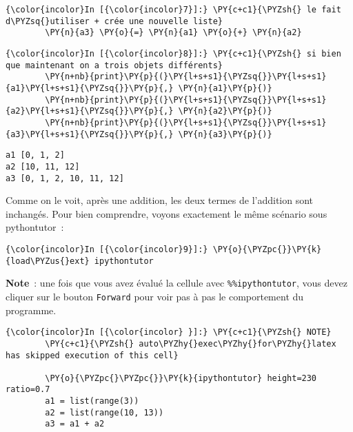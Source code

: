     \begin{Verbatim}[commandchars=\\\{\}]
{\color{incolor}In [{\color{incolor}7}]:} \PY{c+c1}{\PYZsh{} le fait d\PYZsq{}utiliser + crée une nouvelle liste}
        \PY{n}{a3} \PY{o}{=} \PY{n}{a1} \PY{o}{+} \PY{n}{a2}
\end{Verbatim}


    \begin{Verbatim}[commandchars=\\\{\}]
{\color{incolor}In [{\color{incolor}8}]:} \PY{c+c1}{\PYZsh{} si bien que maintenant on a trois objets différents}
        \PY{n+nb}{print}\PY{p}{(}\PY{l+s+s1}{\PYZsq{}}\PY{l+s+s1}{a1}\PY{l+s+s1}{\PYZsq{}}\PY{p}{,} \PY{n}{a1}\PY{p}{)}
        \PY{n+nb}{print}\PY{p}{(}\PY{l+s+s1}{\PYZsq{}}\PY{l+s+s1}{a2}\PY{l+s+s1}{\PYZsq{}}\PY{p}{,} \PY{n}{a2}\PY{p}{)}
        \PY{n+nb}{print}\PY{p}{(}\PY{l+s+s1}{\PYZsq{}}\PY{l+s+s1}{a3}\PY{l+s+s1}{\PYZsq{}}\PY{p}{,} \PY{n}{a3}\PY{p}{)}
\end{Verbatim}


    \begin{Verbatim}[commandchars=\\\{\}]
a1 [0, 1, 2]
a2 [10, 11, 12]
a3 [0, 1, 2, 10, 11, 12]

    \end{Verbatim}

    Comme on le voit, après une addition, les deux termes de l'addition sont
inchangés. Pour bien comprendre, voyons exactement le même scénario sous
pythontutor~:

    \begin{Verbatim}[commandchars=\\\{\}]
{\color{incolor}In [{\color{incolor}9}]:} \PY{o}{\PYZpc{}}\PY{k}{load\PYZus{}ext} ipythontutor
\end{Verbatim}


    \textbf{Note}~: une fois que vous avez évalué la cellule avec
\texttt{\%\%ipythontutor}, vous devez cliquer sur le bouton
\texttt{Forward} pour voir pas à pas le comportement du programme.

    \begin{Verbatim}[commandchars=\\\{\}]
{\color{incolor}In [{\color{incolor} }]:} \PY{c+c1}{\PYZsh{} NOTE}
        \PY{c+c1}{\PYZsh{} auto\PYZhy{}exec\PYZhy{}for\PYZhy{}latex has skipped execution of this cell}
        
        \PY{o}{\PYZpc{}\PYZpc{}}\PY{k}{ipythontutor} height=230 ratio=0.7
        a1 = list(range(3))
        a2 = list(range(10, 13))
        a3 = a1 + a2
\end{Verbatim}


